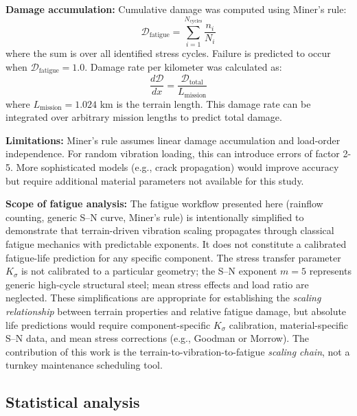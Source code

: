 \documentclass[11pt]{article}
\begin{document}
\textbf{Damage accumulation:} Cumulative damage was computed using Miner's rule:
\begin{equation}
\mathcal{D}_{\text{fatigue}} = \sum_{i=1}^{N_{\text{cycles}}} \frac{n_i}{N_i}
\end{equation}
where the sum is over all identified stress cycles. Failure is predicted to occur when $\mathcal{D}_{\text{fatigue}} = 1.0$. Damage rate per kilometer was calculated as:
\begin{equation}
\frac{d\mathcal{D}}{dx} = \frac{\mathcal{D}_{\text{total}}}{L_{\text{mission}}}
\end{equation}
where $L_{\text{mission}} = 1.024$ km is the terrain length. This damage rate can be integrated over arbitrary mission lengths to predict total damage.

\textbf{Limitations:} Miner's rule assumes linear damage accumulation and load-order independence. For random vibration loading, this can introduce errors of factor 2-5. More sophisticated models (e.g., crack propagation) would improve accuracy but require additional material parameters not available for this study.

\textbf{Scope of fatigue analysis:} The fatigue workflow presented here (rainflow counting, generic S--N curve, Miner's rule) is intentionally simplified to demonstrate that terrain-driven vibration scaling propagates through classical fatigue mechanics with predictable exponents. It does not constitute a calibrated fatigue-life prediction for any specific component. The stress transfer parameter $K_\sigma$ is not calibrated to a particular geometry; the S--N exponent $m = 5$ represents generic high-cycle structural steel; mean stress effects and load ratio are neglected. These simplifications are appropriate for establishing the \emph{scaling relationship} between terrain properties and relative fatigue damage, but absolute life predictions would require component-specific $K_\sigma$ calibration, material-specific S--N data, and mean stress corrections (e.g., Goodman or Morrow). The contribution of this work is the terrain-to-vibration-to-fatigue \emph{scaling chain}, not a turnkey maintenance scheduling tool.

\subsection*{Statistical analysis}
\end{document}
